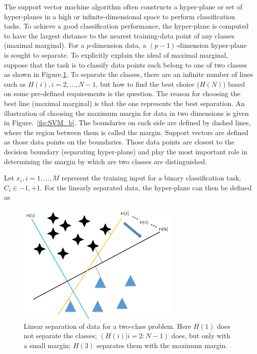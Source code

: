 The support vector machine algorithm \citep{cortes1995support} often constructs a hyper-plane or set of hyper-planes in a high or infinite-dimensional space to perform classification tasks. To achieve a good classification performance, the hyper-plane is computed to have the largest distance to the nearest training-data point of any classes (maximal marginal). For a $p$-dimension data, a $(p-1)$-dimension hyper-plane is sought to separate. To explicitly explain the ideal of maximal marginal, suppose that the task is to classify data points each belong to one of two classes as shown in Figure.\ref{fig:SVM_a}. To separate the classes, there are an infinite number of lines such as $H(i),i=2,…,N-1$, but how to find the best choice ($H(N)$) based on some pre-defined requirements is the question. The reason for choosing the best line (maximal marginal) is that the one represents the best separation.  An illustration of choosing the maximum margin for data in two dimensions is given in Figure.~\ref{fig:SVM_b}. The boundaries on each side are defined by dashed lines, where the region between them is called the margin. Support vectors are defined as those data points on the boundaries.  Those data points are closest to the decision boundary (separating hyper-plane) and play the most important role in determining the margin by which are two classes are distinguished. 

Let $x_{i},i=1,\ldots ,M$ represent the training input for a binary classification task, $C_{i} \in {-1,+1}$. For the linearly separated data, the hyper-plane can then be defined as
  
\begin{figure}[htb!]
\centering
\includegraphics[width=0.7\textwidth]{image/Method/SVM.png}
\caption[A SVM classifier]{Linear separation of data for a two-class problem. Here $H(1)$ does not separate the classes; $(H(i)|i = 2:N-1)$ does, but only with a small margin; $H(3)$ separates them with the maximum margin.}
\label{fig:SVM_a}
\end{figure}
  
